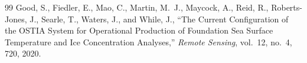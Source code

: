 \documentclass[12pt,reqno]{amsart}
\begin{document}
\begin{thebibliography}{99}
Good, S., Fiedler, E., Mao, C., Martin, M.~J., Maycock, A., Reid, R., Roberts-Jones, J., Searle, T., Waters, J., and While, J.,
``The Current Configuration of the OSTIA System for Operational Production of Foundation Sea Surface Temperature and Ice Concentration Analyses,''
\textit{Remote Sensing}, vol.~12, no.~4, 720, 2020.



\end{thebibliography}
\end{document}
